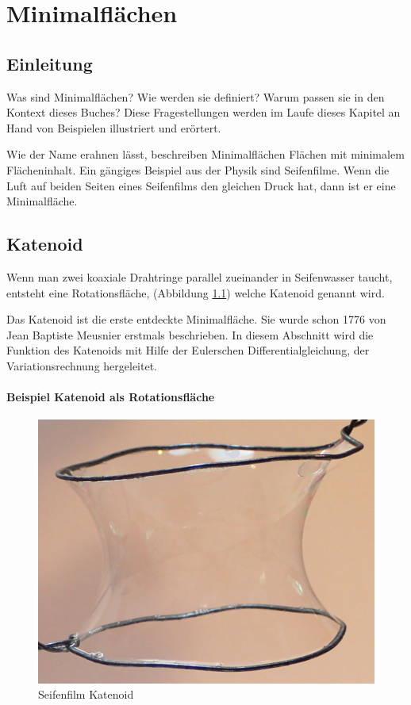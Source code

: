 \chapter{Minimalflächen\label{chapter:minimal}}
\begin{refsection}

\section{Einleitung}
 \label{A_Einleitung}
Was sind Minimalflächen? 
Wie werden sie definiert? 
Warum passen sie in den Kontext dieses Buches?
Diese Fragestellungen werden im Laufe dieses Kapitel an Hand von Beispielen illustriert und erörtert.

Wie der Name erahnen lässt, beschreiben Minimalflächen Flächen mit minimalem Flächeninhalt. 
Ein gängiges Beispiel aus der Physik sind Seifenfilme. Wenn die Luft auf beiden Seiten eines Seifenfilms den gleichen Druck hat, dann ist er eine Minimalfläche.


\section{Katenoid}
 \label{A_Katenoid}
Wenn man zwei koaxiale Drahtringe parallel zueinander in Seifenwasser taucht, entsteht eine Rotationsfläche, (Abbildung \ref{KatenoidSeifenfilm}) welche Katenoid genannt wird. 

Das Katenoid ist die erste entdeckte Minimalfläche.
Sie wurde schon 1776 von Jean Baptiste Meusnier erstmals beschrieben.
In diesem Abschnitt wird die Funktion des Katenoids mit Hilfe der Eulerschen Differentialgleichung, der Variationsrechnung hergeleitet.
\subsubsection{Beispiel Katenoid als Rotationsfläche}

\begin{figure}
  \centering
  \includegraphics[scale=0.5]{minimal/Cartenoid_Foto.png}
  \caption{Seifenfilm Katenoid} 
  \label{KatenoidSeifenfilm}
\end{figure}



\end{refsection}

